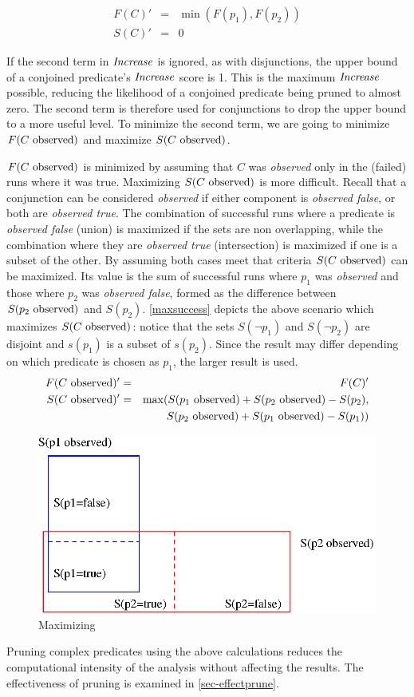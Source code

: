 \begin{eqnarray*}
  F(C)' &=&  \min(F(p_1),F(p_2)) \\
  S(C)' &=& 0
\end{eqnarray*}

If the second term in $\mathit{Increase}$ is ignored, as with disjunctions, the upper bound of a conjoined predicate's $\mathit{Increase}$ score is 1.  This is the maximum $\mathit{Increase}$ possible, reducing the likelihood of a conjoined predicate being pruned to almost zero.  The second term is therefore used for conjunctions to drop the upper bound to a more useful level. To minimize the second term, we are going to minimize $F(\text{$C$ observed})$ and maximize $S(\text{$C$ observed})$.

$F(\text{$C$ observed})$ is minimized by assuming that $C$ was \textit{observed} only in the (failed) runs where it was true.  Maximizing $S(\text{$C$ observed})$ is more difficult.  Recall that a conjunction can be considered \textit{observed} if either component is \textit{observed false}, or both are \textit{observed true}.  The combination of successful runs where a predicate is \textit{observed false} (union) is maximized if the sets are non overlapping, while the combination where they are \textit{observed true} (intersection) is maximized if one is a subset of the other.  By assuming both cases meet that criteria $S(\text{$C$ observed})$ can be maximized.  Its value is the sum of successful runs where $p_1$ was \textit{observed} and those where $p_2$ was \textit{observed false}, formed as the difference between $S(\text{$p_2$ observed})$ and $S(p_2)$.  \autoref{maxsuccess} depicts the above scenario which maximizes $S(\text{$C$ observed})$: notice that the sets $S(\neg p_1)$ and $S(\neg p_2)$ are disjoint and $s(p_1)$ is a subset of $s(p_2)$.  Since the result may differ depending on which predicate is chosen as $p_1$, the larger result is used.
\begin{eqnarray*}
  F(\text{$C$ observed})' &=& F(C)' \\
  S(\text{$C$ observed})' &=&
  \max(S(\text{$p_1$ observed}) + S(\text{$p_2$ observed}) - S(p_2),\\
  & &\ \ \ \ S(\text{$p_2$ observed}) + S(\text{$p_1$ observed}) - S(p_1))
\end{eqnarray*}

\begin{figure}[h]
  \centering
  \includegraphics[scale = 0.6]{charts/maxsuccess}
  \caption{Maximizing }
  \label{maxsuccess}
\end{figure}

Pruning complex predicates using the above calculations reduces the computational intensity of the analysis without affecting the results.  The effectiveness of pruning is examined in \autoref{sec-effectprune}.
